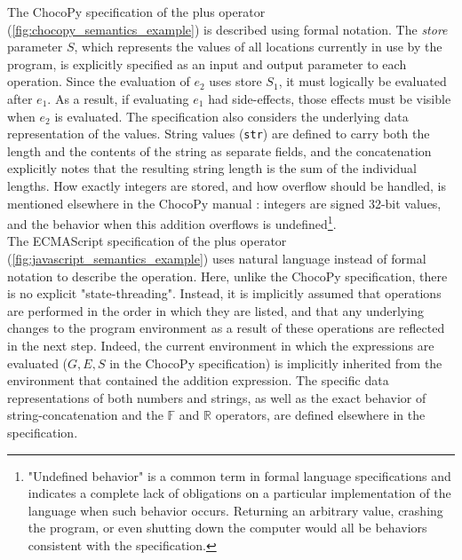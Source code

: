 The ChocoPy specification of the plus operator (\cref{fig:chocopy_semantics_example}) is described using formal notation. The \textit{store} parameter $S$, which represents the values of all locations currently in use by the program, is explicitly specified as an input and output parameter to each operation. Since the evaluation of $e_2$ uses store $S_1$, it must logically be evaluated after $e_1$. As a result, if evaluating $e_1$ had side-effects, those effects must be visible when $e_2$ is evaluated. The specification also considers the underlying data representation of the values. String values (\texttt{str}) are defined to carry both the length and the contents of the string as separate fields, and the concatenation explicitly notes that the resulting string length is the sum of the individual lengths. How exactly integers are stored, and how overflow should be handled, is mentioned elsewhere in the ChocoPy manual \cite{PadhyeSH19}: integers are signed 32-bit values, and the behavior when this addition overflows is undefined\footnote{"Undefined behavior" is a common term in formal language specifications and indicates a complete lack of obligations on a particular implementation of the language when such behavior occurs. Returning an arbitrary value, crashing the program, or even shutting down the computer would all be behaviors consistent with the specification.}.\\

The ECMAScript specification of the plus operator (\cref{fig:javascript_semantics_example}) uses natural language instead of formal notation to describe the operation. Here, unlike the ChocoPy specification, there is no explicit "state-threading". Instead, it is implicitly assumed that operations are performed in the order in which they are listed, and that any underlying changes to the program environment as a result of these operations are reflected in the next step. Indeed, the current environment in which the expressions are evaluated ($ G, E, S $ in the ChocoPy specification) is implicitly inherited from the environment that contained the addition expression. The specific data representations of both numbers and strings, as well as the exact behavior of string-concatenation and the $\mathbb{F}$ and $\mathbb{R}$ operators, are defined elsewhere in the specification.\\

